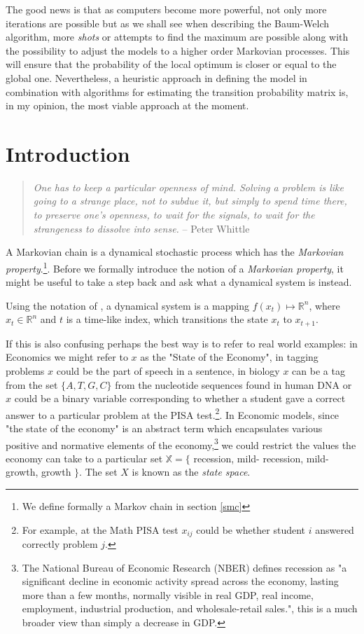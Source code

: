 \documentclass[a4paper,12pt]{article}
\theoremstyle{definition}
\begin{document}
The good news is that as computers become more powerful, not only more iterations are possible but as we shall see when describing the Baum-Welch algorithm, more \textit{shots} or attempts to find the maximum are possible along with the possibility to adjust the models to a  higher order Markovian processes. This will ensure that the probability of the local optimum is closer or equal to the global one. Nevertheless, a heuristic approach in defining the model in combination with algorithms for estimating the transition probability matrix is, in my opinion, the most viable approach at the moment. 

\newpage
\section{Introduction}
\begin{quote}
\textit{One has to keep a particular openness of mind. Solving a problem is like going to a strange place, not to subdue it, but simply to spend time there, to preserve one’s openness, to wait for the signals, to wait for the strangeness to dissolve into sense.}  – Peter Whittle
\end{quote}

A Markovian chain is a dynamical stochastic process which has the \textit{Markovian property}.\footnote{We define formally a Markov chain in section \ref{smc}}.  Before we formally introduce the notion of a \textit{Markovian property}, it might be useful to take a step back and ask what a dynamical system is instead. 

Using the notation of \citep{fraser08}, a dynamical system is a mapping $f(x_{t}) \mapsto \mathbb{R}^{n}$, where $x_{t} \in \mathbb{R}^n$ and $t$ is a time-like index, which transitions the state $x_t$ to $x_{t+1}$.

If this is also confusing perhaps the best way is to refer to real world examples: in Economics we might refer to $x$ as the "State of the Economy", in tagging problems $x$ could be the part of speech in a sentence, in biology $x$ can be a tag  from the set $\{A,T,G,C\}$ from the nucleotide sequences found in human DNA or $x$ could be a binary variable corresponding to whether a student gave a correct answer to a particular problem at the PISA test.\footnote{For example, at the Math PISA test $x_{ij}$ could be whether student $i$ answered correctly problem $j$.}. 
In Economic models, since "the state of the economy" is an abstract term which encapsulates various positive and normative elements of the economy,\footnote{The National Bureau of Economic Research (NBER) defines recession as  "a significant decline in economic activity spread across the economy, lasting more than a few months, normally visible in real GDP, real income, employment, industrial production, and wholesale-retail sales.", this is a much broader view than simply a decrease in GDP.} we could restrict the values the economy can take to a particular set $\mathbb{X} = \{$ recession, mild- recession, mild-growth, growth $\}$. The set $X$ is known as the \textit{state space}.
\end{document}
